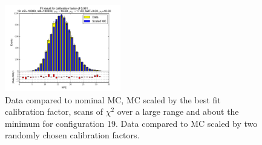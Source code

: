 \begin{figure}[htbp]
\begin{center}
\includegraphics[width=0.45\textwidth]{../FIGURES/19/FIG_Fit_result_for_calibration_factor_of_0_981.pdf} 
\caption{Data compared to nominal MC, MC scaled by the best fit calibration factor, scans of $\chi^2$ over a large range and about the minimum for configuration 19. Data compared to MC scaled by two randomly chosen calibration factors.} 
\label{tab:best_19} 
\end{center} \end{figure} 

